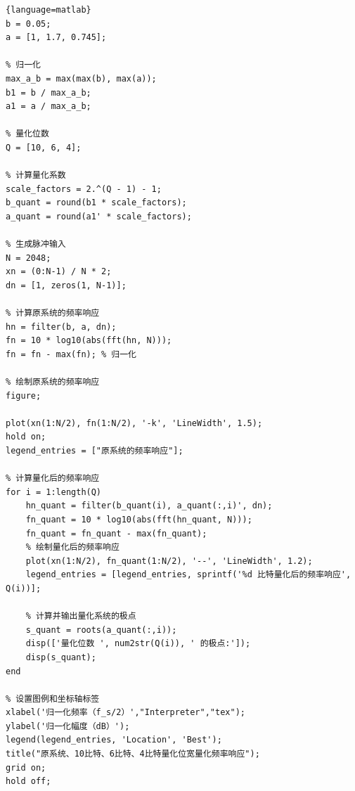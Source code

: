 \begin{lstlisting}{language=matlab}
b = 0.05;
a = [1, 1.7, 0.745];

% 归一化
max_a_b = max(max(b), max(a));
b1 = b / max_a_b;
a1 = a / max_a_b;

% 量化位数
Q = [10, 6, 4];

% 计算量化系数
scale_factors = 2.^(Q - 1) - 1;
b_quant = round(b1 * scale_factors);
a_quant = round(a1' * scale_factors); 

% 生成脉冲输入
N = 2048;
xn = (0:N-1) / N * 2;
dn = [1, zeros(1, N-1)];

% 计算原系统的频率响应
hn = filter(b, a, dn);
fn = 10 * log10(abs(fft(hn, N)));
fn = fn - max(fn); % 归一化

% 绘制原系统的频率响应
figure;

plot(xn(1:N/2), fn(1:N/2), '-k', 'LineWidth', 1.5);
hold on;
legend_entries = ["原系统的频率响应"];

% 计算量化后的频率响应
for i = 1:length(Q)
    hn_quant = filter(b_quant(i), a_quant(:,i)', dn);
    fn_quant = 10 * log10(abs(fft(hn_quant, N)));
    fn_quant = fn_quant - max(fn_quant);
    % 绘制量化后的频率响应
    plot(xn(1:N/2), fn_quant(1:N/2), '--', 'LineWidth', 1.2);
    legend_entries = [legend_entries, sprintf('%d 比特量化后的频率响应', Q(i))];
    
    % 计算并输出量化系统的极点
    s_quant = roots(a_quant(:,i));
    disp(['量化位数 ', num2str(Q(i)), ' 的极点:']);
    disp(s_quant);
end

% 设置图例和坐标轴标签
xlabel('归一化频率（f_s/2）',"Interpreter","tex");
ylabel('归一化幅度（dB）');
legend(legend_entries, 'Location', 'Best');
title("原系统、10比特、6比特、4比特量化位宽量化频率响应");
grid on;
hold off;

\end{lstlisting}


